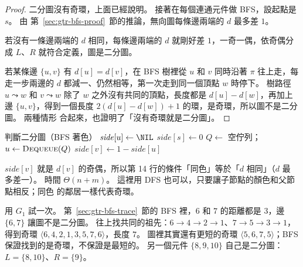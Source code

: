 \begin{proof}
二分圖沒有奇環，上面已經說明。 接著在每個連通元件做 BFS，設起點是 $s$。 由
第~\ref{sec:gtr-bfs-proof}~節的推論，無向圖每條邊兩端的 $d$ 最多差 $1$。

若沒有一條邊兩端的 $d$ 相同，每條邊兩端的 $d$ 就剛好差 $1$，一奇一偶，依奇偶分成 $L$、$R$
就符合定義，圖是二分圖。

若某條邊 $\{u, v\}$ 有 $d[u] = d[v]$，在 BFS 樹裡從 $u$ 和 $v$ 同時沿著 $\pi$ 往上走，每
走一步兩邊的 $d$ 都減一、仍然相等，第一次走到同一個頂點 $w$ 時停下。 樹路徑 $u \leadsto
w$ 和 $v \leadsto w$ 除了 $w$ 之外沒有共同的頂點，長度都是 $d[u] - d[w]$，再加上邊
$\{u, v\}$，得到一個長度 $2(d[u] - d[w]) + 1$ 的環，是奇環，所以圖不是二分圖。 兩種情形
合起來，也證明了「沒有奇環就是二分圖」。
\end{proof}

\begin{pseudo}[label=alg:gtr-bip]{判斷二分圖（BFS 著色）}
        \State $\mathit{side}[u] \gets \NIL$
    \EndFor
         
            \State $\mathit{side}[s] \gets 0$
            \State $Q \gets$ 空佇列；
                \State $u \gets \Call{Dequeue}{Q}$
                        \State $\mathit{side}[v] \gets 1 - \mathit{side}[u]$
                        \State {}
                        \State \Return \FALSE {}
                    \EndIf
                \EndFor
            \EndWhile
        \EndIf
    \EndFor
    \State \Return \TRUE
\EndFunction
\end{pseudo}

$\mathit{side}[v]$ 就是 $d[v]$ 的奇偶，所以第 14 行的條件「同色」等於「$d$ 相同」（$d$ 最
多差一）。 時間 $\Theta(n + m)$。 這裡用 DFS 也可以，只要讓子節點的顏色和父節點相反；同色
的鄰居一樣代表奇環。

用 $G_1$ 試一次。 第~\ref{sec:gtr-bfs-trace}~節的 BFS 裡，$6$ 和 $7$ 的距離都是 $3$，邊
$\{6, 7\}$ 讓圖不是二分圖。 往上找共同的祖先：$6 \to 4 \to 2 \to 1$、$7 \to 5 \to 3 \to 1$，
得到奇環 $\langle 6, 4, 2, 1, 3, 5, 7, 6 \rangle$，長度 $7$。 圖裡其實還有更短的奇環
$\langle 5, 6, 7, 5 \rangle$；BFS 保證找到的是奇環，不保證是最短的。 另一個元件
$\{8, 9, 10\}$ 自己是二分圖：$L = \{8, 10\}$、$R = \{9\}$。

